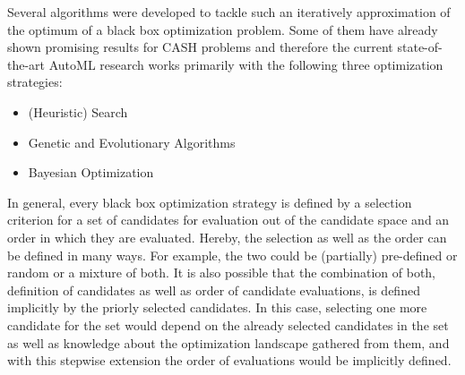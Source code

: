 Several algorithms were developed to tackle such an iteratively approximation of the optimum of a black box optimization problem.
Some of them have already shown promising results for CASH problems and therefore the current state-of-the-art AutoML research works primarily with the following three optimization strategies:
\begin{itemize}
    \item (Heuristic) Search
    \item Genetic and Evolutionary Algorithms
    \item Bayesian Optimization
\end{itemize}
In general, every black box optimization strategy is defined by a selection criterion for a set of candidates for evaluation out of the candidate space and an order in which they are evaluated.
Hereby, the selection as well as the order can be defined in many ways.
For example, the two could be (partially) pre-defined or random or a mixture of both.
It is also possible that the combination of both, definition of candidates as well as order of candidate evaluations, is defined implicitly by the priorly selected candidates.
In this case, selecting one more candidate for the set would depend on the already selected candidates in the set as well as knowledge about the optimization landscape gathered from them, and with this stepwise extension the order of evaluations would be implicitly defined.

